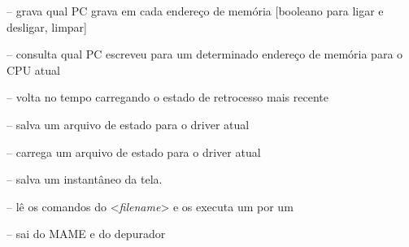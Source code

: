\documentclass[letterpaper,10pt,brazil]{sphinxmanual}
\begin{document}
\begin{DUlineblock}{0em}
\item[] {\hyperref[debugger/general:debugger\string-command\string-trackmem]{}} -- grava qual PC grava em cada endereço de memória {[}booleano para ligar e desligar, limpar{]}
\item[] {\hyperref[debugger/general:debugger\string-command\string-pcatmem]{}} -- consulta qual PC escreveu para um determinado endereço de memória para o CPU atual
\item[] {\hyperref[debugger/general:debugger\string-command\string-rewind]{}} -- volta no tempo carregando o estado de retrocesso mais recente
\item[] {\hyperref[debugger/general:debugger\string-command\string-statesave]{}} -- salva um arquivo de estado para o driver atual
\item[] {\hyperref[debugger/general:debugger\string-command\string-stateload]{}} -- carrega um arquivo de estado para o driver atual
\item[] {\hyperref[debugger/general:debugger\string-command\string-snap]{}} -- salva um instantâneo da tela.
\item[] {\hyperref[debugger/general:debugger\string-command\string-source]{}} -- lê os comandos do \textless{}\emph{filename}\textgreater{} e os executa um por um
\item[] {\hyperref[debugger/general:debugger\string-command\string-quit]{}} -- sai do MAME e do depurador
\end{DUlineblock}
\begin{quote}
\label{debugger/general:debugger-command-do}\end{quote}
\end{document}
